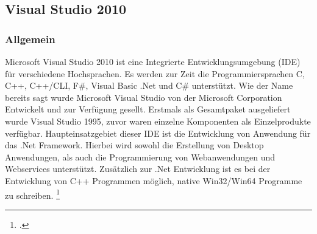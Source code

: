 \subsection{Visual Studio 2010}
\subsubsection{Allgemein}
Microsoft Visual Studio 2010 ist eine Integrierte Entwicklungsumgebung (IDE) für verschiedene Hochsprachen. Es werden zur Zeit die Programmiersprachen C, C++, C++/CLI, F\#, Visual Basic .Net und C\# unterstützt.
Wie der Name bereits sagt wurde Microsoft Visual Studio von der Microsoft Corporation Entwickelt und zur Verfügung gesellt. Erstmals als Gesamtpaket ausgeliefert wurde Visual Studio 1995, zuvor waren einzelne Komponenten als Einzelprodukte verfügbar.
Haupteinsatzgebiet dieser IDE ist die Entwicklung von Anwendung für das .Net Framework. Hierbei wird sowohl die Erstellung von Desktop Anwendungen, als auch die Programmierung von Webanwendungen und Webservices unterstützt.
Zusätzlich zur .Net Entwicklung ist es bei der Entwicklung von C++ Programmen möglich, native Win32/Win64 Programme zu schreiben. \footcite[vgl.][]{vs}
